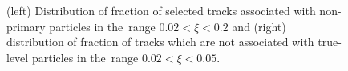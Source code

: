 \begin{figure}[h!]

	\caption{(left) Distribution of fraction of selected tracks  associated with non-primary particles  in the~range $0.02<\xi<0.2$ and  (right) distribution of fraction of tracks which are not associated with true-level particles  in the~range $0.02<\xi<0.05$.}
	\label{fig:bkg_fake_charged}
\end{figure}

